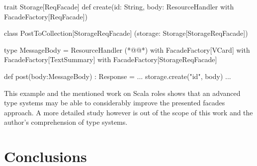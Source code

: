 \documentclass[11pt,a4paper,headsepline,twoside]{scrartcl}		%
\begin{document}
\begin{javalisting}[label=fig:facades-with-scala-types,
                   numbers=left,
                   escapeinside={(*@}{@*)},
                   caption={Implementing the facades approach with Scala's type system}]
trait Storage[ReqFacade] {
 def create(id: String,
            body: ResourceHandler
                  with FacadeFactory[ReqFacade])
}

class PostToCollection[StorageReqFacade]
            (storage: Storage[StorageReqFacade]) {
 type MessageBody = ResourceHandler (*@\label{line-scala-compound}@*)
                    with FacadeFactory[VCard] 
                    with FacadeFactory[TextSummary]
                    with FacadeFactory[StorageReqFacade]
  
 def post(body:MessageBody) : Response = {
  ...
  storage.create("id", body)
  ...
 }
}
\end{javalisting}

This example and the mentioned work on Scala roles shows that an advanced type
systems may be able to considerably improve the presented facades approach. A
more detailed study however is out of the scope of this work and the author's
comprehension of type systems. %

\section{Conclusions}
\label{sec:conclusions}



\end{document}
